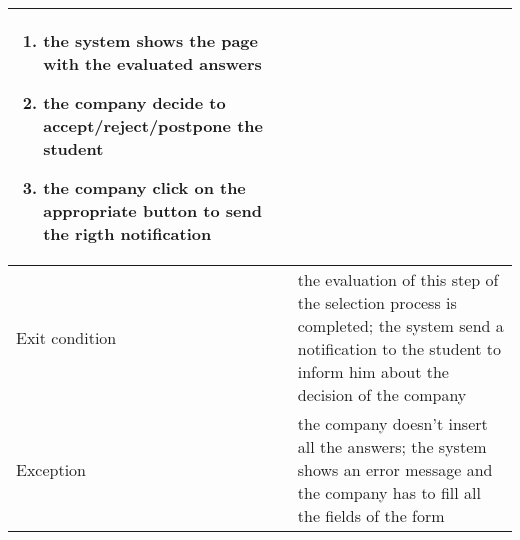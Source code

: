 \begin{table} [H]
\begin{tabular}{|| P{7.5cm} | P{7.5cm} ||}
{\begin{enumerate}[label=\alpha]
								\item the system shows the page with the evaluated answers
								\item the company decide to accept/reject/postpone the student
								\item the company click on the appropriate button to send the rigth notification
						\end{enumerate}} \\
						\hline 
						Exit condition & the evaluation of this step of the selection process is completed; the system send a notification to the student to inform him about the decision of the company   \\
						\hline
						Exception & the company doesn't insert all the answers; the system shows an error message and the company has to fill all the fields of the form \\
						\hline
					\end{tabular}
				\end{table}
				
